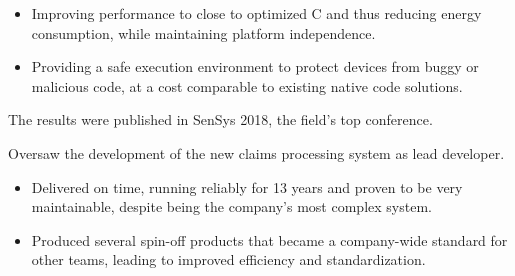 \documentclass[10pt,a4paper]{../altacv}
\begin{document}
\medskip

\begin{itemize}
	\item Improving performance to close to optimized C and thus reducing energy consumption, while maintaining platform independence.
	\smallskip
	\item Providing a safe execution environment to protect devices from buggy or malicious code, at a cost comparable to existing native code solutions.
\end{itemize}

\medskip

The results were published in SenSys 2018, the field's top conference.

\medskip


\medskip\medskip{}

Oversaw the development of the new claims processing system as lead developer.

\medskip

\begin{itemize}
	\item Delivered on time, running reliably for 13 years and proven to be very maintainable, despite being the company's most complex system.
	\smallskip
	\item Produced several spin-off products that became a company-wide standard for other teams, leading to improved efficiency and standardization.
\end{itemize}

\medskip

\end{document}
